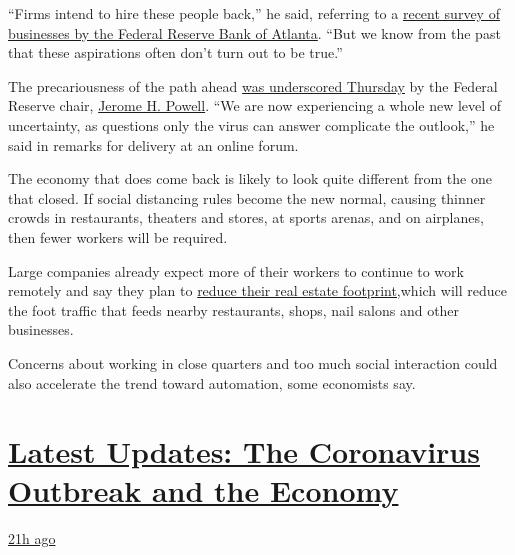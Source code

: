 ``Firms intend to hire these people back,'' he said, referring to a
\href{https://www.frbatlanta.org/research/surveys/business-uncertainty}{recent
survey of businesses by the Federal Reserve Bank of Atlanta}. ``But we
know from the past that these aspirations often don't turn out to be
true.''

The precariousness of the path ahead
\href{https://www.nytimes3xbfgragh.onion/2020/05/21/business/economy/fed-chair-warns-this-is-a-downturn-without-modern-precedent.html}{was
underscored Thursday} by the Federal Reserve chair,
\href{https://www.nytimes3xbfgragh.onion/2020/05/19/business/coronavirus-stocks-economy.html}{Jerome
H. Powell}. ``We are now experiencing a whole new level of uncertainty,
as questions only the virus can answer complicate the outlook,'' he said
in remarks for delivery at an online forum.

The economy that does come back is likely to look quite different from
the one that closed. If social distancing rules become the new normal,
causing thinner crowds in restaurants, theaters and stores, at sports
arenas, and on airplanes, then fewer workers will be required.

Large companies already expect more of their workers to continue to work
remotely and say they plan to
\href{https://www.prnewswire.com/news-releases/deloitte-cfo-signals-survey-executive-teams-are-largely-focused-on-adapting-operations-for-near-term-performance-and-evolving-their-businesses-for-a-post-crisis-future-301061671.html}{reduce
their real estate footprint,}which will reduce the foot traffic that
feeds nearby restaurants, shops, nail salons and other businesses.

Concerns about working in close quarters and too much social interaction
could also accelerate the trend toward automation, some economists say.

\hypertarget{latest-updates-the-coronavirus-outbreak-and-the-economy}{%
\section{\texorpdfstring{\href{https://www.nytimes3xbfgragh.onion/live/2020/08/20/business/stock-market-today-coronavirus?action=click\&pgtype=Article\&state=default\&region=MAIN_CONTENT_1\&context=storylines_live_updates}{Latest
Updates: The Coronavirus Outbreak and the
Economy}}{Latest Updates: The Coronavirus Outbreak and the Economy}}\label{latest-updates-the-coronavirus-outbreak-and-the-economy}}

\href{https://www.nytimes3xbfgragh.onion/live/2020/08/20/business/stock-market-today-coronavirus?action=click\&pgtype=Article\&state=default\&region=MAIN_CONTENT_1\&context=storylines_live_updates\#american-airlines-to-stop-flights-to-15-cities-after-government-aid-ends}{21h
ago}

